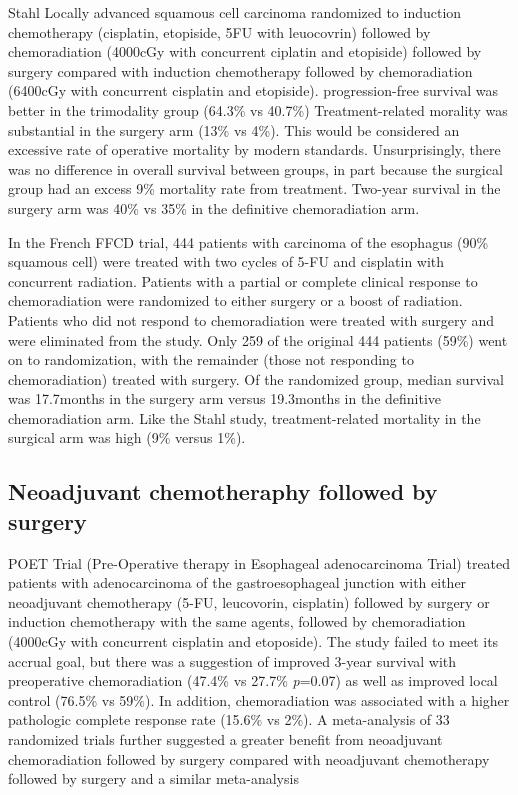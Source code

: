 \documentclass[
]{book}
\begin{document}
Stahl Locally advanced squamous cell carcinoma randomized to induction chemotherapy (cisplatin, etopiside, 5FU with leuocovrin) followed by chemoradiation (4000cGy with concurrent ciplatin and etopiside) followed by surgery compared with induction chemotherapy followed by chemoradiation (6400cGy with concurrent cisplatin and etopiside).\citep{stahl2310} progression-free survival was better in the trimodality group (64.3\% vs 40.7\%) Treatment-related morality was substantial in the surgery arm (13\% vs 4\%). This would be considered an excessive rate of operative mortality by modern standards. Unsurprisingly, there was no difference in overall survival between groups, in part because the surgical group had an excess 9\% mortality rate from treatment. Two-year survival in the surgery arm was 40\% vs 35\% in the definitive chemoradiation arm. \citep{stahl4530}

In the French FFCD trial, 444 patients with carcinoma of the esophagus (90\% squamous cell) were treated with two cycles of 5-FU and cisplatin with concurrent radiation.\citep{bedenne1160} Patients with a partial or complete clinical response to chemoradiation were randomized to either surgery or a boost of radiation. Patients who did not respond to chemoradiation were treated with surgery and were eliminated from the study. Only 259 of the original 444 patients (59\%) went on to randomization, with the remainder (those not responding to chemoradiation) treated with surgery. Of the randomized group, median survival was 17.7months in the surgery arm versus 19.3months in the definitive chemoradiation arm. Like the Stahl study, treatment-related mortality in the surgical arm was high (9\% versus 1\%).

\hypertarget{neoadjuvant-chemotheraphy-followed-by-surgery}{%
\subsection{Neoadjuvant chemotheraphy followed by surgery}\label{neoadjuvant-chemotheraphy-followed-by-surgery}}

POET Trial (Pre-Operative therapy in Esophageal adenocarcinoma Trial) treated patients with adenocarcinoma of the gastroesophageal junction with either neoadjuvant chemotherapy (5-FU, leucovorin, cisplatin) followed by surgery or induction chemotherapy with the same agents, followed by chemoradiation (4000cGy with concurrent cisplatin and etoposide). The study failed to meet its accrual goal, but there was a suggestion of improved 3-year survival with preoperative chemoradiation (47.4\% vs 27.7\% \emph{p}=0.07) as well as improved local control (76.5\% vs 59\%). In addition, chemoradiation was associated with a higher pathologic complete response rate (15.6\% vs 2\%)\citep{stahl851}. A meta-analysis of 33 randomized trials further suggested a greater benefit from neoadjuvant chemoradiation followed by surgery compared with neoadjuvant chemotherapy followed by surgery\citep{pasquali481} and a similar meta-analysis \citep{sjoquist681}
\end{document}

